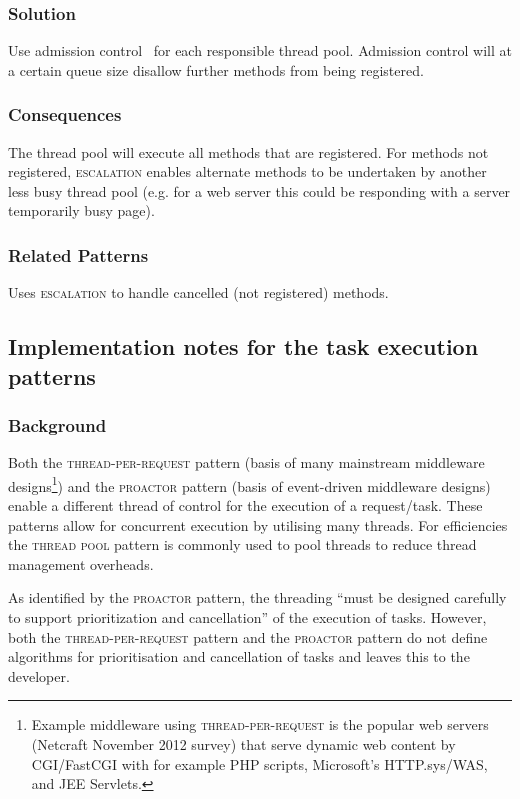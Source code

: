 \documentclass[prodmode]{style/acmlarge}
\begin{document}
\subsubsection*{Solution} Use admission control~\cite{seda} for each responsible
thread pool.  Admission control will at a certain queue size disallow further
methods from being registered.

\subsubsection*{Consequences} The thread pool will execute all methods that are
registered.  For methods not registered, \textsc{escalation} enables alternate
methods to be undertaken by another less busy thread pool (e.g. for a web server
this could be responding with a server temporarily busy page).

\subsubsection*{Related Patterns} Uses \textsc{escalation} to handle cancelled
(not registered) methods.



\subsection{Implementation notes for the task execution patterns}

\subsubsection*{Background}

Both the \textsc{thread-per-request} pattern \cite{thread-per-request} (basis of
many mainstream middleware designs\footnote{Example middleware using
\textsc{thread-per-request} is the popular web servers (Netcraft November 2012
survey) that serve dynamic web content by CGI/FastCGI with for example PHP scripts,
Microsoft's HTTP.sys/WAS, and JEE Servlets.}) and the \textsc{proactor} pattern
\cite{proactor} (basis of event-driven middleware designs) enable a different
thread of control for the execution of a request/task.  These patterns
allow for concurrent execution by utilising many threads.  For efficiencies the
\textsc{thread pool} pattern \cite{thread-per-request} is commonly used to pool
threads to reduce thread management overheads.

As identified by the \textsc{proactor} pattern, the threading ``must be designed
carefully to support prioritization and cancellation'' \cite[p. 8]{proactor} of
the execution of tasks.  However, both the \textsc{thread-per-request} pattern and
the \textsc{proactor} pattern do not define algorithms for
prioritisation and cancellation of tasks and leaves this to the developer.
\end{document}
